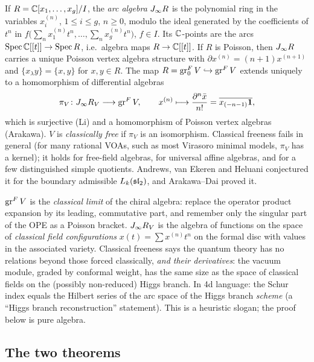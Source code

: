 If $R={\mathbb{C}}[x_1,\dots,x_g]/I$, the \emph{arc algebra} $J_\infty R$ is the polynomial ring in the variables
$x_i^{(n)}$, $1\le i\le g$, $n\ge0$, modulo the ideal generated by the coefficients of $t^n$ in
$f\bigl(\sum_n x_1^{(n)}t^n,\dots,\sum_nx_g^{(n)}t^n\bigr)$, $f\in I$. Its ${\mathbb{C}}$-points are the arcs
$\operatorname{Spec}{\mathbb{C}}[[t]]\to\operatorname{Spec}R$, i.e.\ algebra maps $R\to{\mathbb{C}}[[t]]$. If $R$ is Poisson, then
$J_\infty R$ carries a unique Poisson vertex algebra structure with $\partial x^{(n)}=(n+1)x^{(n+1)}$ and
$\{x_\lambda y\}=\{x,y\}$ for $x,y\in R$. The map $R=\operatorname{gr}^F_0V\hookrightarrow\operatorname{gr}^F V$ extends uniquely
to a homomorphism of differential algebras
\begin{equation}\label{l20:eq:canonical}
\pi_V\colon J_\infty R_V\longrightarrow\operatorname{gr}^F V,\qquad x^{(n)}\longmapsto\frac{\partial^n\bar x}{n!}
=\overline{x_{(-n-1)}\mathbf{1}},
\end{equation}
which is surjective (Li) and a homomorphism of Poisson vertex algebras (Arakawa). $V$ is \emph{classically
free} if $\pi_V$ is an isomorphism. Classical freeness fails in general (for many rational VOAs, such as most
Virasoro minimal models, $\pi_V$ has a kernel); it holds for free-field algebras, for universal affine
algebras, and for a few distinguished simple quotients. Andrews, van Ekeren and Heluani conjectured it for
the boundary admissible $L_k(\mathfrak{sl}_2)$, and Arakawa--Dai proved it.

\begin{physics}
$\operatorname{gr}^F V$ is the \emph{classical limit} of the chiral algebra: replace the operator product expansion by
its leading, commutative part, and remember only the singular part of the OPE as a Poisson bracket.
$J_\infty R_V$ is the algebra of functions on the space of \emph{classical field configurations}
$x(t)=\sum x^{(n)}t^n$ on the formal disc with values in the associated variety. Classical freeness says the
quantum theory has no relations beyond those forced classically, \emph{and their derivatives}: the vacuum
module, graded by conformal weight, has the same size as the space of classical fields on the (possibly
non-reduced) Higgs branch. In 4d language: the Schur index equals the Hilbert series of the arc space of the
Higgs branch \emph{scheme} (a ``Higgs branch reconstruction'' statement). This is a heuristic slogan; the
proof below is pure algebra.
\end{physics}

\subsection{The two theorems}

